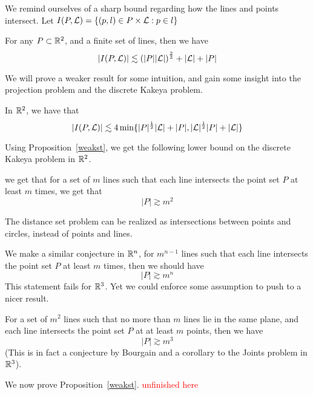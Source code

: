 We remind ourselves of a sharp bound regarding how the lines and points intersect. Let $I(P,\mathcal{L})=\{(p,l)\in P\times \mathcal{L}: p\in l\}$ 
\begin{theorem}
    For any $P\subset\mathbb{R}^2$, and a finite set of lines, then we have
    \begin{equation*}
        |I(P,\mathcal{L})|\lesssim \left(|P||\mathcal{L}|\right)^\frac{2}{3}+|\mathcal{L}|+|P|
    \end{equation*}
\end{theorem}
We will prove a weaker result for some intuition, and gain some insight into the projection problem and the discrete Kakeya problem.
\begin{proposition}[Weaker S-T]
    \label{weakst}
    In $\mathbb{R}^2$, we have that
    \begin{equation}
        |I(P,\mathcal{L})|\lesssim 4\min\{|P|^\frac{1}{2}|\mathcal{L}|+|P|, |\mathcal{L}|^\frac{1}{2}|P|+|\mathcal{L}|\}
    \end{equation}
\end{proposition}
Using Proposition~\ref{weakst}, we get the following lower bound on the discrete Kakeya problem in $\mathbb{R}^2$.
\begin{corollary}
    we get that for a set of $m$ lines such that each line intersects the point set $P$ at least $m$ times, we get that
    \begin{equation*}
        |P|\gtrsim m^2
    \end{equation*}
\end{corollary}
\begin{note}
    The distance set problem can be realized as intersections between points and circles, instead of points and lines.
\end{note}
We make a similar conjecture in $\mathbb{R}^n$, for $m^{n-1}$ lines such that each line intersects the point set $P$ at least $m$ times, then we should have
\begin{equation*}
    |P|\gtrsim m^n
\end{equation*}
This statement fails for $\mathbb{R}^3$. Yet we could enforce some assumption to push to a nicer result.
\begin{theorem}
    For a set of $m^2$ lines such that no more than $m$ lines lie in the same plane, and each line intersects the point set $P$ at at least $m$ points, then we have
    \begin{equation*}
        |P|\gtrsim m^3
    \end{equation*}
    (This is in fact a conjecture by Bourgain and a corollary to the Joints problem in $\mathbb{R}^3$).
\end{theorem}
We now prove Proposition~\ref{weakst}. \textcolor{red}{unfinished here}

